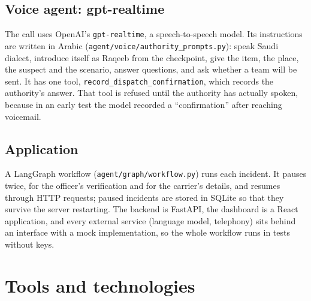 \documentclass[11pt,a4paper]{article}
\newcommand{\code}[1]{\texttt{#1}}
\begin{document}
\subsection{Voice agent: gpt-realtime}

The call uses OpenAI's \code{gpt-realtime}, a speech-to-speech model. Its instructions are written in
Arabic (\code{agent/voice/authority\_prompts.py}): speak Saudi dialect, introduce itself as Raqeeb from
the checkpoint, give the item, the place, the suspect and the scenario, answer questions, and ask
whether a team will be sent. It has one tool, \code{record\_dispatch\_confirmation}, which records the
authority's answer. That tool is refused until the authority has actually spoken, because in an
early test the model recorded a ``confirmation'' after reaching voicemail.

\subsection{Application}

A LangGraph workflow (\code{agent/graph/workflow.py}) runs each incident. It pauses twice, for the
officer's verification and for the carrier's details, and resumes through HTTP requests; paused
incidents are stored in SQLite so that they survive the server restarting. The backend is FastAPI,
the dashboard is a React application, and every external service (language model, telephony) sits
behind an interface with a mock implementation, so the whole workflow runs in tests without keys.

\section{Tools and technologies}
\end{document}
